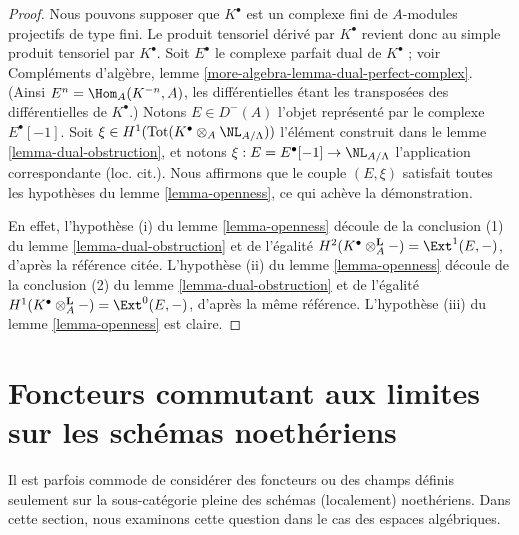 \begin{proof}
Nous pouvons supposer que $K^\bullet$ est un complexe fini de
$A$-modules projectifs de type fini. Le produit tensoriel dérivé par $K^\bullet$
revient donc au simple produit tensoriel par $K^\bullet$. Soit
$E^\bullet$ le complexe parfait dual de $K^\bullet$ ; voir
Compléments d'algèbre, lemme \ref{more-algebra-lemma-dual-perfect-complex}.
(Ainsi $E^n = \Hom_A(K^{-n}, A)$, les différentielles étant les transposées des
différentielles de $K^\bullet$.) Notons $E \in D^{-}(A)$ l'objet
représenté par le complexe $E^\bullet[-1]$.
Soit $\xi \in H^1(\text{Tot}(K^\bullet \otimes_A \NL_{A/\Lambda}))$
l'élément construit dans le lemme \ref{lemma-dual-obstruction},
et notons $\xi : E = E^\bullet[-1] \to \NL_{A/\Lambda}$ l'application
correspondante (loc. cit.). Nous affirmons que le couple $(E, \xi)$ satisfait toutes les
hypothèses du lemme \ref{lemma-openness}, ce qui achève la démonstration.

\medskip\noindent
En effet, l'hypothèse (i) du lemme \ref{lemma-openness} découle de la conclusion
(1) du lemme \ref{lemma-dual-obstruction}
et de l'égalité $H^2(K^\bullet \otimes_A^\mathbf{L} -) =
\Ext^1(E, -)$, d'après la référence citée. L'hypothèse (ii) du
lemme \ref{lemma-openness} découle de la conclusion (2) du
lemme \ref{lemma-dual-obstruction}
et de l'égalité $H^1(K^\bullet \otimes_A^\mathbf{L} -) =
\Ext^0(E, -)$, d'après la même référence. L'hypothèse (iii) du lemme \ref{lemma-openness}
est claire.
\end{proof}







\section{Foncteurs commutant aux limites sur les schémas noethériens}
\label{section-noetherian}

\noindent
Il est parfois commode de considérer des foncteurs ou des champs définis seulement
sur la sous-catégorie pleine des schémas (localement) noethériens. Dans cette section,
nous examinons cette question dans le cas des espaces algébriques.

